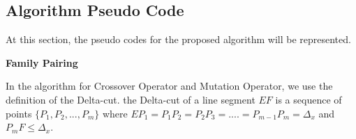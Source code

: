 \documentclass[final]{elsarticle}
\begin{document}
\subsection{Algorithm Pseudo Code}

At this section, the pseudo codes for the proposed algorithm will be represented.

\begin{algorithm}[H]
	\SetAlgoLined
	\caption{\textbf{Family Pairing}} 
	\label{alg.1}
\end{algorithm} 

In the algorithm for Crossover Operator and Mutation Operator, we use the definition of  the Delta-cut. the Delta-cut of a line segment $EF$ is a sequence of points $\{P_1,P_2,...,P_m\}$ where $EP_1=P_1P_2=P_2P_3=....=P_{m-1}P_m=\Delta_x$ and $P_mF \leq \Delta_x$.\\
\end{document}
